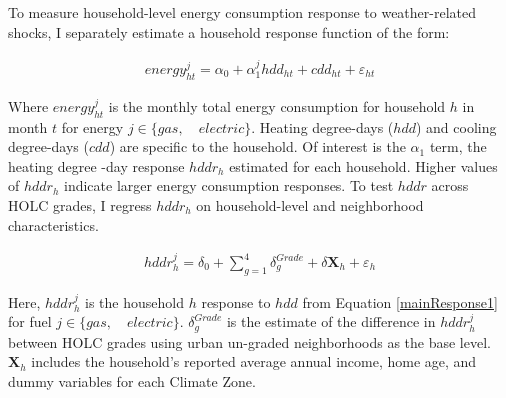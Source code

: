 \documentclass[
]{article}
\begin{document}
To measure household-level energy consumption response to weather-related shocks, I separately estimate a household response function of the form:

\begin{eqnarray}
energy^{j}_{ht} = \alpha_0 + \alpha_1^j hdd_{ht} + cdd_{ht} + \varepsilon_{ht} \label{mainResponse1}
\end{eqnarray}

Where \(energy^{j}_{ht}\) is the monthly total energy consumption for household \(h\) in month \(t\) for energy \(j\in \{gas,\quad electric\}\). Heating degree-days (\(hdd\)) and cooling degree-days (\(cdd\)) are specific to the household. Of interest is the \(\alpha_1\) term, the heating degree -day response \(hddr_h\) estimated for each household. Higher values of \(hddr_h\) indicate larger energy consumption responses. To test \(hddr\) across HOLC grades, I regress \(hddr_{h}\) on household-level and neighborhood characteristics.

\begin{eqnarray}
hddr^j_{h} = \delta_0 + \sum_{g=1}^4 \delta_{g}^{Grade} +  \delta \mathbf{X}_h + \varepsilon_{h} \label{mainResponse2}
\end{eqnarray}

Here, \(hddr^j_h\) is the household \(h\) response to \(hdd\) from Equation \ref{mainResponse1} for fuel \(j \in \{gas, \quad electric\}\). \(\delta_g^{Grade}\) is the estimate of the difference in \(hddr^j_h\) between HOLC grades using urban un-graded neighborhoods as the base level. \(\mathbf{X}_h\) includes the household's reported average annual income, home age, and dummy variables for each Climate Zone.
\end{document}
